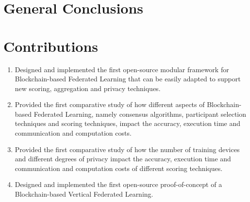 \todo{}
    
\section{General Conclusions}\label{conclusions:general}


    




\section{Contributions}\label{conclusions:contributions}

\begin{enumerate}
    \item Designed and implemented the first open-source modular framework for Blockchain-based Federated Learning that can be easily adapted to support new scoring, aggregation and privacy techniques.
    
    \item Provided the first comparative study of how different aspects of Blockchain-based Federated Learning, namely consensus algorithms, participant selection techniques and scoring techniques, impact the accuracy, execution time and communication and computation costs.
    
    \item Provided the first comparative study of how the number of training devices and different degrees of privacy impact the accuracy, execution time and communication and computation costs of different scoring techniques.
    
    \item Designed and implemented the first open-source proof-of-concept of a Blockchain-based Vertical Federated Learning.
\end{enumerate}

